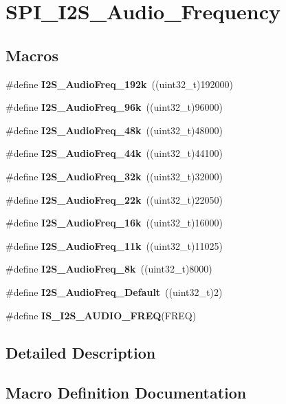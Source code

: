 \section{S\+P\+I\+\_\+\+I2\+S\+\_\+\+Audio\+\_\+\+Frequency}
\label{group__SPI__I2S__Audio__Frequency}
\subsection*{Macros}
\begin{DoxyCompactItemize}
\item 
\#define \textbf{ I2\+S\+\_\+\+Audio\+Freq\+\_\+192k}~((uint32\+\_\+t)192000)
\item 
\#define \textbf{ I2\+S\+\_\+\+Audio\+Freq\+\_\+96k}~((uint32\+\_\+t)96000)
\item 
\#define \textbf{ I2\+S\+\_\+\+Audio\+Freq\+\_\+48k}~((uint32\+\_\+t)48000)
\item 
\#define \textbf{ I2\+S\+\_\+\+Audio\+Freq\+\_\+44k}~((uint32\+\_\+t)44100)
\item 
\#define \textbf{ I2\+S\+\_\+\+Audio\+Freq\+\_\+32k}~((uint32\+\_\+t)32000)
\item 
\#define \textbf{ I2\+S\+\_\+\+Audio\+Freq\+\_\+22k}~((uint32\+\_\+t)22050)
\item 
\#define \textbf{ I2\+S\+\_\+\+Audio\+Freq\+\_\+16k}~((uint32\+\_\+t)16000)
\item 
\#define \textbf{ I2\+S\+\_\+\+Audio\+Freq\+\_\+11k}~((uint32\+\_\+t)11025)
\item 
\#define \textbf{ I2\+S\+\_\+\+Audio\+Freq\+\_\+8k}~((uint32\+\_\+t)8000)
\item 
\#define \textbf{ I2\+S\+\_\+\+Audio\+Freq\+\_\+\+Default}~((uint32\+\_\+t)2)
\item 
\#define \textbf{ I\+S\+\_\+\+I2\+S\+\_\+\+A\+U\+D\+I\+O\+\_\+\+F\+R\+EQ}(F\+R\+EQ)
\end{DoxyCompactItemize}


\subsection{Detailed Description}


\subsection{Macro Definition Documentation}
\mbox{\label{group__SPI__I2S__Audio__Frequency_ga3adf95fadd1ad75670ed1babd5faca39}} 
